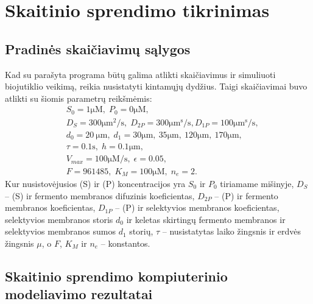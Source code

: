 \documentclass[12pt, a4paper, lithuanian]{article}
\begin{document}
\section{Skaitinio sprendimo tikrinimas}
\subsection{Pradinės skaičiavimų sąlygos}

Kad su parašyta programa būtų galima atlikti skaičiavimus ir simuliuoti
biojutiklio veikimą, reikia nusistatyti kintamųjų dydžius. Taigi skaičiavimai
buvo atlikti su šiomis parametrų reikšmėmis:
 \begin{equation}
 \begin{aligned}
     &S_0 = 1 \mathrm{\mu M},\; P_0 = 0 \mathrm{\mu M},\\
     &D_S = 300 \mathrm{\mu m^2/s},\; D_{2P} = 300 \mathrm{\mu m^s/s}, D_{1P} = 100 \mathrm{\mu m^s/s},\\\
     &d_0 = 20\ \mathrm{\mu m},\; d_1 = 30 \mathrm{\mu
 m},\ 35 \mathrm{\mu m},\ 120 \mathrm{\mu m},\ 170\mathrm{\mu m},\;\\
     &\tau = 0.1\mathrm{s},\; h=0.1 \mathrm{\mu m},\\
     &V_{max} = 100\mathrm{\mu M /s},\; \epsilon = 0.05,\\
     &F=961485,\; K_M= 100\mathrm{\mu M},\; n_e = 2.
 \end{aligned}
 \end{equation}
Kur nusistovėjusios (S) ir (P) koncentracijos yra $S_0$ ir $P_0$ tiriamame
mišinyje, $D_S$ – (S) ir fermento membranos difuzinis koeficientas, 
$D_{2P}$ – (P) ir fermento membranos koeficientas, $D_{1P}$ –
     (P) ir selektyvios membranos koeficientas,
     selektyvios membranos storis $d_0$ ir keletas skirtingų fermento membranos
     ir selektyvios membranos sumos
     $d_1$ storių,
     $\tau$ – nusistatytas laiko žingsnis ir erdvės žingsnis $\mu$, o $F$, $K_M$
     ir $n_e$ – konstantos.

\subsection{Skaitinio sprendimo kompiuterinio modeliavimo rezultatai}
\end{document}
